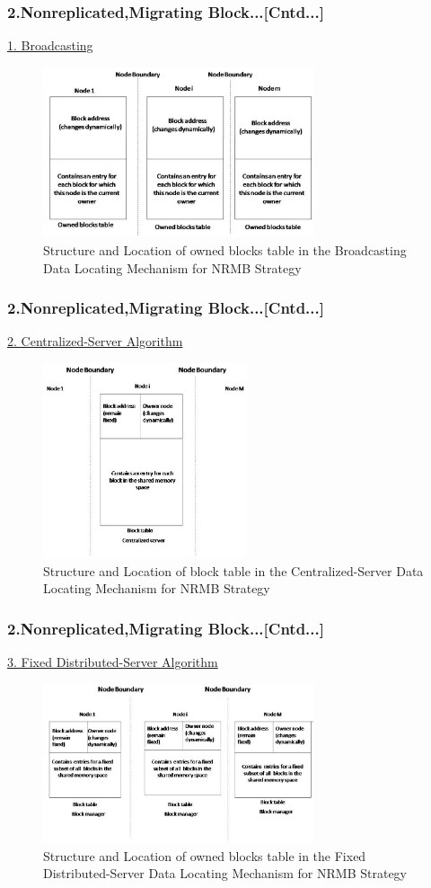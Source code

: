 \documentclass{beamer}
\begin{document}
\begin{frame}
	\frametitle{2.Nonreplicated,Migrating Block...[Cntd...]}
	\underline{1. Broadcasting}
	\vspace{0.25cm}
	\begin{figure}
		\centering
		\includegraphics[width=8cm]{fig55.jpg}
		\caption{Structure and Location of owned blocks table in the Broadcasting Data Locating Mechanism for NRMB Strategy}
		\label{fig55}
	\end{figure}
\end{frame}


\begin{frame}
	\frametitle{2.Nonreplicated,Migrating Block...[Cntd...]}
	\underline{2. Centralized-Server Algorithm}
	\vspace{0.25cm}
	\begin{figure}
		\centering
		\includegraphics[width=6cm]{fig56.jpg}
		\caption{Structure and Location of block table in the Centralized-Server Data Locating Mechanism for NRMB Strategy}
		\label{fig56}
	\end{figure}
\end{frame}


\begin{frame}
	\frametitle{2.Nonreplicated,Migrating Block...[Cntd...]}
	\underline{3. Fixed Distributed-Server Algorithm}
	\vspace{0.25cm}
	\begin{figure}
		\centering
		\includegraphics[width=8cm]{fig57.jpg}
		\caption{Structure and Location of owned blocks table in the Fixed Distributed-Server Data Locating Mechanism for NRMB Strategy}
		\label{fig57}
	\end{figure}
\end{frame}
\end{document}
